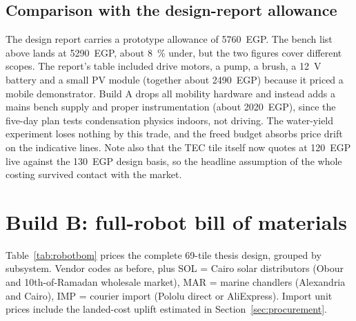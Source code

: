 \documentclass[11pt,a4paper]{article}
\begin{document}
\subsection{Comparison with the design-report allowance}
The design report carries a prototype allowance of \num{5760}~EGP. The
bench list above lands at \num{5290}~EGP, about \SI{8}{\percent} under, but
the two figures cover different scopes. The report's table included drive
motors, a pump, a brush, a \SI{12}{\volt} battery and a small PV module
(together about \num{2490}~EGP) because it priced a mobile demonstrator.
Build A drops all mobility hardware and instead adds a mains bench supply
and proper instrumentation (about \num{2020}~EGP), since the five-day plan
tests condensation physics indoors, not driving. The water-yield experiment
loses nothing by this trade, and the freed budget absorbs price drift on
the indicative lines. Note also that the TEC tile itself now quotes at
\num{120}~EGP live against the \num{130}~EGP design basis, so the
headline assumption of the whole costing survived contact with the market.

\section{Build B: full-robot bill of materials}

Table~\ref{tab:robotbom} prices the complete 69-tile thesis design, grouped
by subsystem. Vendor codes as before, plus SOL = Cairo solar distributors
(Obour and 10th-of-Ramadan wholesale market), MAR = marine chandlers
(Alexandria and Cairo), IMP = courier import (Pololu direct or AliExpress).
Import unit prices include the landed-cost uplift estimated in
Section~\ref{sec:procurement}.
\end{document}
